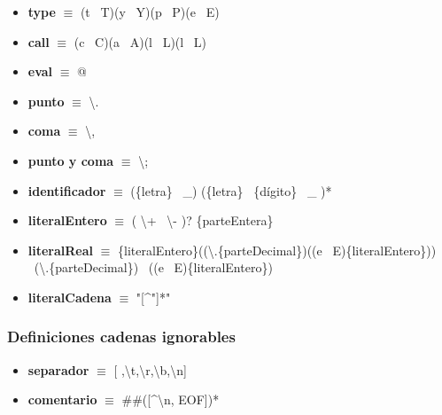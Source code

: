\documentclass[11pt]{article}
\begin{document}
\begin{itemize}
            \item \textbf{type }$\equiv$ (t \textbar\ T)(y \textbar\ Y)(p \textbar\ P)(e \textbar\ E)
            \item \textbf{call }$\equiv$ (c \textbar\ C)(a \textbar\ A)(l \textbar\ L)(l \textbar\ L)
            \item \textbf{eval }$\equiv$ @
            \item \textbf{punto }$\equiv$ \textbackslash.
            \item \textbf{coma }$\equiv$ \textbackslash,
            \item \textbf{punto y coma }$\equiv$ \textbackslash;
            \item \textbf{identificador }$\equiv$ (\{letra\} \textbar\ \_) (\{letra\} \textbar\ \{dígito\} \textbar\ \_ )*
            \item \textbf{literalEntero }$\equiv$ ( \textbackslash + \textbar\ \textbackslash - )? \{parteEntera\}
            \item \textbf{literalReal }  $\equiv$ \{literalEntero\}((\textbackslash.\{parteDecimal\})((e \textbar\ E)\{literalEntero\})) \textbar\ (\textbackslash.\{parteDecimal\}) \textbar\ ((e \textbar\ E)\{literalEntero\})
            \item \textbf{literalCadena }  $\equiv$ "[^"]*"
        \end{itemize}
        \subsubsection*{Definiciones cadenas ignorables}
        \begin{itemize}
            \item \textbf{separador }$\equiv$ [ ,\textbackslash t,\textbackslash r,\textbackslash b,\textbackslash n]
            \item \textbf{comentario }$\equiv$ \#\#([\^{}\textbackslash n, EOF])*
        \end{itemize}
\end{document}
